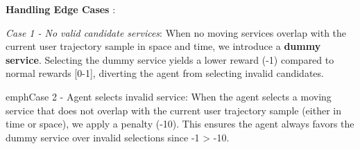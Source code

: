 \documentclass[10pt,twocolumn]{article}
\begin{document}
\textbf{Handling Edge Cases} \cite{neiat2021}:

\emph{Case 1 - No valid candidate services}: When no moving services
overlap with the current user trajectory sample in space and time, we
introduce a \textbf{dummy service}. Selecting the dummy service yields a
lower reward (-1) compared to normal rewards {[}0-1{]}, diverting the
agent from selecting invalid candidates.

emph{Case 2 - Agent selects invalid service}: When the agent selects a
moving service that does not overlap with the current user trajectory
sample (either in time or space), we apply a penalty (-10). This ensures
the agent always favors the dummy service over invalid selections since
-1 \textgreater{} -10.

\begin{table}[htbp]
	\centering
	\caption{A2C Training Algorithm for Moving IoT Service Composition}
	\label{a2c-training-algo}
\end{table}
\end{document}
